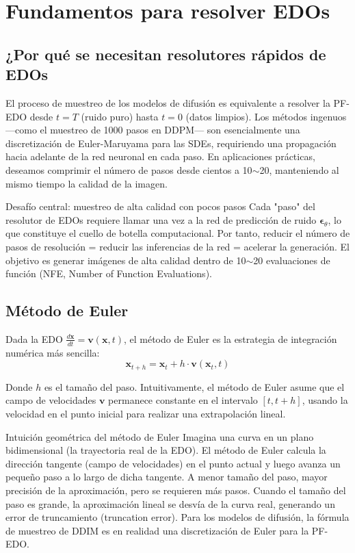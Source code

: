 \section{Fundamentos para resolver EDOs}

\subsection{¿Por qué se necesitan resolutores rápidos de EDOs}

El proceso de muestreo de los modelos de difusión es equivalente a resolver la PF-EDO desde $t=T$ (ruido puro) hasta $t=0$ (datos limpios). Los métodos ingenuos —como el muestreo de 1000 pasos en DDPM— son esencialmente una discretización de Euler-Maruyama para las SDEs, requiriendo una propagación hacia adelante de la red neuronal en cada paso. En aplicaciones prácticas, deseamos comprimir el número de pasos desde cientos a 10$\sim$20, manteniendo al mismo tiempo la calidad de la imagen.

\begin{importantbox}{Desafío central: muestreo de alta calidad con pocos pasos}
Cada "paso" del resolutor de EDOs requiere llamar una vez a la red de predicción de ruido $\boldsymbol{\epsilon}_\theta$, lo que constituye el cuello de botella computacional. Por tanto, reducir el número de pasos de resolución = reducir las inferencias de la red = acelerar la generación. El objetivo es generar imágenes de alta calidad dentro de 10$\sim$20 evaluaciones de función (NFE, Number of Function Evaluations).
\end{importantbox}

\subsection{Método de Euler}

Dada la EDO $\frac{d\mathbf{x}}{dt} = \mathbf{v}(\mathbf{x}, t)$, el método de Euler es la estrategia de integración numérica más sencilla:
$$\mathbf{x}_{t+h} = \mathbf{x}_t + h \cdot \mathbf{v}(\mathbf{x}_t, t)$$

Donde $h$ es el tamaño del paso. Intuitivamente, el método de Euler asume que el campo de velocidades $\mathbf{v}$ permanece constante en el intervalo $[t, t+h]$, usando la velocidad en el punto inicial para realizar una extrapolación lineal.

\begin{knowledgebox}{Intuición geométrica del método de Euler}
Imagina una curva en un plano bidimensional (la trayectoria real de la EDO). El método de Euler calcula la dirección tangente (campo de velocidades) en el punto actual y luego avanza un pequeño paso a lo largo de dicha tangente. A menor tamaño del paso, mayor precisión de la aproximación, pero se requieren más pasos. Cuando el tamaño del paso es grande, la aproximación lineal se desvía de la curva real, generando un error de truncamiento (truncation error). Para los modelos de difusión, la fórmula de muestreo de DDIM es en realidad una discretización de Euler para la PF-EDO.
\end{knowledgebox}

